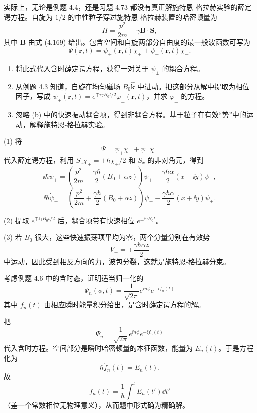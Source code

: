 \begin{question}
实际上，无论是例题 4.4，还是习题 4.73 都没有真正解施特恩-格拉赫实验的薛定谔方程。自旋为 $1/2$ 的中性粒子穿过施特恩-格拉赫装置的哈密顿量为
\[
H=\frac{p^2}{2m}-\gamma\mathbf B\cdot\mathbf S,
\]
其中 $\mathbf B$ 由式 (4.169) 给出。包含空间和自旋两部分自由度的最一般波函数可写为
\[
\Psi(\mathbf r,t)=\psi_+(\mathbf r,t)\chi_+ + \psi_-(\mathbf r,t)\chi_-.
\]
\begin{enumerate}
\item 将此式代入含时薛定谔方程，获得一对关于 $\psi_\pm$ 的耦合方程。
\item 从例题 4.3 知道，自旋在均匀磁场 $B_0\hat{\mathbf k}$ 中进动。把这部分从解中提取为相位因子，写成 $\psi_\pm(\mathbf r,t)=e^{\mp i\gamma B_0t/2}\varphi_\pm(\mathbf r,t)$，并求 $\varphi_\pm$ 的方程。
\item 忽略 (b) 中的快速振动耦合项，得到非耦合方程。基于粒子在有效“势”中的运动，解释施特恩-格拉赫实验。
\end{enumerate}

\par\smallskip
{}

\end{question}
\begin{solution}

(1) 将
\[
\Psi=\psi_+\chi_++\psi_-\chi_-
\]
代入薛定谔方程，利用 $S_z\chi_\pm=\pm\hbar\chi_\pm/2$ 和 $S_x$ 的非对角元，得到
\[
\ii\hbar\dot\psi_+=\left(\frac{p^2}{2m}-\frac{\gamma\hbar}{2}(B_0+\alpha z)\right)\psi_+-\frac{\gamma\hbar\alpha}{2}(x-\ii y)\psi_-,
\]
\[
\ii\hbar\dot\psi_-=\left(\frac{p^2}{2m}+\frac{\gamma\hbar}{2}(B_0+\alpha z)\right)\psi_- -\frac{\gamma\hbar\alpha}{2}(x+\ii y)\psi_+.
\]

(2) 提取 $e^{\mp\ii\gamma B_0t/2}$ 后，耦合项带有快速相位 $e^{\pm\ii\gamma B_0t}$。

(3) 若 $B_0$ 很大，这些快速振荡项平均为零，两个分量分别在有效势
\[
V_\pm=\mp\frac{\gamma\hbar\alpha z}{2}
\]
中运动，因此受到相反方向的力，波包分裂，这就是施特恩-格拉赫分束。

\end{solution}

\begin{question}
考虑例题 4.6 中的含时态，证明适当归一化的
\[
\Psi_n(\phi,t)=\frac{1}{\sqrt{2\pi}}e^{in\phi}e^{-if_n(t)}
\]
其中 $f_n(t)$ 由相应瞬时能量积分给出，是含时薛定谔方程的解。
\end{question}
\begin{solution}

把
\[
\Psi_n=\frac{1}{\sqrt{2\pi}}e^{\ii n\phi}e^{-\ii f_n(t)}
\]
代入含时方程。空间部分是瞬时哈密顿量的本征函数，能量为 $E_n(t)$。于是方程化为
\[
\hbar\dot f_n(t)=E_n(t).
\]
故
\[
f_n(t)=\frac1\hbar\int^t E_n(t')\dd t'
\]
（差一个常数相位无物理意义），从而题中形式确为精确解。

\end{solution}

